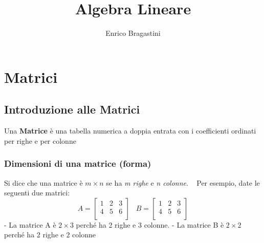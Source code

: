 \documentclass[12pt,oneside]{book}
\title{\Large{\textbf{Algebra Lineare}}}
\author{Enrico Bragastini}
\begin{document}
\pagestyle{fancy}
\fancyhf{}
\rhead{}
\lhead{\nouppercase\leftmark}
\cfoot{\thepage}
\frontmatter

\maketitle
\tableofcontents

\mainmatter
\chapter{Matrici}

\section{Introduzione alle Matrici}
Una \textbf{Matrice} è una tabella numerica a doppia entrata con i coefficienti ordinati per righe
e per colonne

\subsection{Dimensioni di una matrice (forma)}
Si dice che una matrice è $m \times n$ se ha \emph{m righe} e \emph{n colonne}.
~\newline
Per esempio, date le seguenti due matrici:
\begin{equation*}
    A =
    \begin{bmatrix}
        1 & 2 & 3 \\
        4 & 5 & 6 \\
    \end{bmatrix}
    \; \; \; B =
    \begin{bmatrix}
        1 & 2 & 3 \\
        4 & 5 & 6 \\
    \end{bmatrix}
\end{equation*}
- La matrice A è $2 \times 3$ perché ha 2 righe e 3 colonne. \newline
- La matrice B è $2 \times 2$ perché ha 2 righe e 2 colonne
\end{document}
